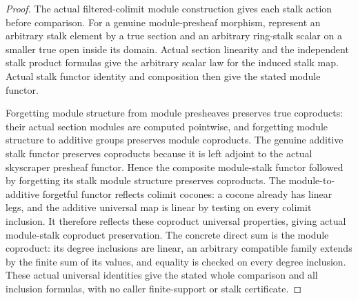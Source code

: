 \begin{proof}
The actual filtered-colimit module construction gives each stalk action
before comparison. For a genuine module-presheaf morphism, represent an
arbitrary stalk element by a true section and an arbitrary ring-stalk
scalar on a smaller true open inside its domain. Actual section linearity
and the independent stalk product formulas give the arbitrary scalar
law for the induced stalk map. Actual stalk functor identity and
composition then give the stated module functor.

Forgetting module structure from module presheaves preserves true
coproducts: their actual section modules are computed pointwise, and
forgetting module structure to additive groups preserves module
coproducts. The genuine additive stalk functor preserves coproducts
because it is left adjoint to the actual skyscraper presheaf functor.
Hence the composite module-stalk functor followed by forgetting its
stalk module structure preserves coproducts. The module-to-additive
forgetful functor reflects colimit cocones: a cocone already has linear
legs, and the additive universal map is linear by testing on every
colimit inclusion. It therefore reflects these coproduct universal
properties, giving actual module-stalk coproduct preservation. The
concrete direct sum is the module coproduct: its degree inclusions are
linear, an arbitrary compatible family extends by the finite sum of
its values, and equality is checked on every degree inclusion. These
actual universal identities give the stated whole comparison and all
inclusion formulas, with no caller finite-support or stalk certificate.
\end{proof}

